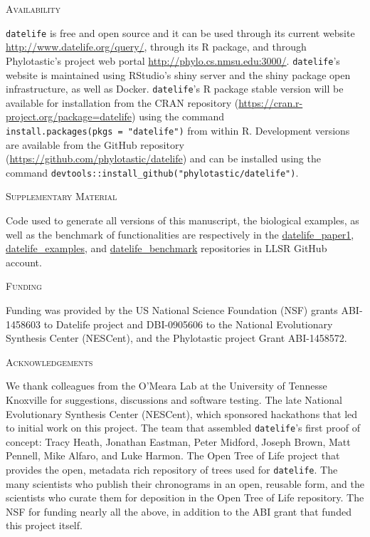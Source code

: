 \documentclass[]{article}
\begin{document}
\begin{center}
\textsc{Availability}
\end{center}

\texttt{datelife} is free and open source and it can be used through its current website
\url{http://www.datelife.org/query/}, through its R package, and through Phylotastic's project web portal \url{http://phylo.cs.nmsu.edu:3000/}.
\texttt{datelife}'s website is maintained using RStudio's shiny server and the shiny package open infrastructure, as well as Docker.
\texttt{datelife}'s R package stable version will be available
for installation from the CRAN repository (\url{https://cran.r-project.org/package=datelife})
using the command \texttt{install.packages(pkgs\ =\ "datelife")} from within R. Development versions
are available from the GitHub repository (\url{https://github.com/phylotastic/datelife})
and can be installed using the command \texttt{devtools::install\_github("phylotastic/datelife")}.

\begin{center}
\textsc{Supplementary Material}
\end{center}

Code used to generate all versions of this manuscript, the biological examples, as well as the benchmark of functionalities are respectively in the \href{https://github.com/LunaSare/datelife_paper1}{datelife\_paper1}, \href{https://github.com/LunaSare/datelife_examples}{datelife\_examples}, and \href{https://github.com/LunaSare/datelife_benchmark}{datelife\_benchmark} repositories in LLSR GitHub account.

\begin{center}
\textsc{Funding}
\end{center}

Funding was provided by the US National Science Foundation (NSF) grants ABI-1458603 to Datelife project and DBI-0905606 to the National Evolutionary Synthesis Center (NESCent), and the Phylotastic project Grant ABI-1458572.

\begin{center}
\textsc{Acknowledgements}
\end{center}

We thank colleagues from the O'Meara Lab at the University
of Tennesse Knoxville for suggestions, discussions and software testing.
The late National Evolutionary Synthesis Center (NESCent), which sponsored hackathons
that led to initial work on this project. The team that assembled \texttt{datelife}'s first proof of concept: Tracy Heath, Jonathan Eastman, Peter Midford, Joseph Brown, Matt Pennell, Mike Alfaro, and Luke Harmon.
The Open Tree of Life project that provides the open, metadata rich repository of
trees used for \texttt{datelife}.
The many scientists who publish their chronograms in an open, reusable form, and
the scientists who curate them for deposition in the Open Tree of Life repository.
The NSF for funding nearly all the above, in addition to the ABI grant that funded this project itself.
\newpage
\end{document}
